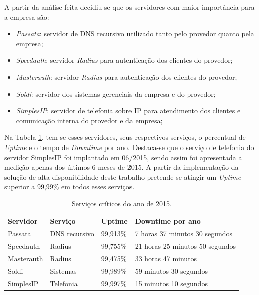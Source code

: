 A partir da análise feita decidiu-se que os servidores com maior importância para a empresa são:
\begin{itemize}
 \item \textit{Passata}: servidor de \ac{DNS} recursivo utilizado tanto pelo provedor quanto pela empresa;
 \item \textit{Speedauth}: servidor \textit{Radius} para autenticação dos clientes do provedor;
 \item \textit{Masterauth}: servidor \textit{Radius} para autenticação dos clientes do provedor;
 \item \textit{Soldi}: servidor dos sistemas gerenciais da empresa e do provedor;
 \item \textit{SimplesIP}: servidor de telefonia sobre \ac{IP} para atendimento dos clientes e comunicação interna do provedor e da empresa;
\end{itemize}

Na Tabela \ref{tab:dispservcrit}, tem-se esses servidores, seus respectivos serviços, o percentual de \textit{Uptime} e o tempo de 
\textit{Downtime} por ano. Destaca-se que o serviço de telefonia do servidor SimplesIP foi implantado em 06/2015, sendo assim foi apresentada a 
medição apenas dos últimos 6 meses de 2015.
A partir da implementação da solução de alta disponibilidade deste trabalho pretende-se atingir um \textit{Uptime} superior a 99,99\% em
todos esses serviços.

\begin{table}[h!]
\caption{Serviços críticos do ano de 2015.}
\label{tab:dispservcrit}
\begin{center}
\begin{tabular}{|l|l|l|l|}\hline
\textbf{Servidor} & \textbf{Serviço} & \textbf{Uptime} & \textbf{Downtime por ano} \\\hline
Passata & DNS recursivo & 99,913\% & 7 horas 37 minutos 30 segundos \\\hline
Speedauth & Radius & 99,755\% & 21 horas 25 minutos 50 segundos \\\hline
Masterauth & Radius & 99,475\% & 33 horas 47 minutos \\\hline
Soldi & Sistemas & 99,989\% & 59 minutos 30 segundos \\\hline
SimplesIP & Telefonia & 99,997\% & 15 minutos 10 segundos \\\hline %
\end{tabular}
\end{center}
\end{table}


